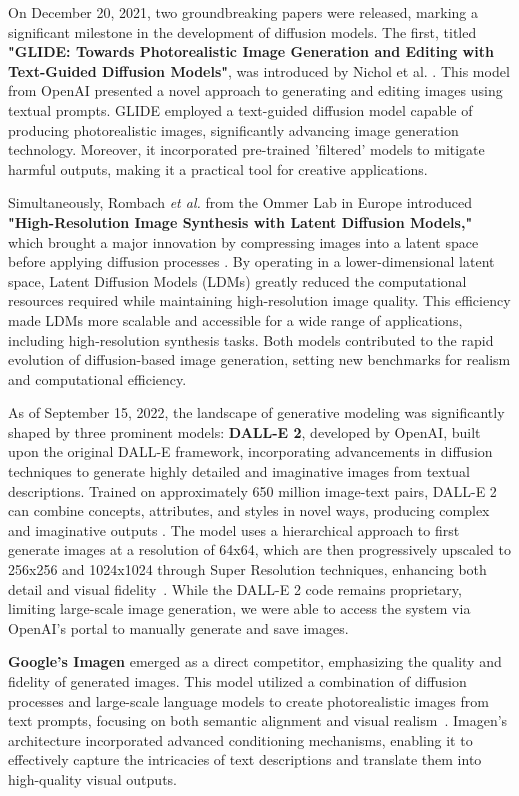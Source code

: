 \documentclass[12pt,DIV14,BCOR12mm,a4paper,footinclude=false,headinclude,parskip=half-,twoside,openright,cleardoublepage=empty,toc=index,bibliography=totoc,listof=totoc]{scrreprt}
\numberwithin{equation}{chapter}
\begin{document}
On December 20, 2021, two groundbreaking papers were released, marking a significant milestone in the development of diffusion models. The first, titled \textbf{"GLIDE: Towards Photorealistic Image Generation and Editing with Text-Guided Diffusion Models"}, was introduced by Nichol et al. \cite{nichol2021glide}. This model from OpenAI presented a novel approach to generating and editing images using textual prompts. GLIDE employed a text-guided diffusion model capable of producing photorealistic images, significantly advancing image generation technology. Moreover, it incorporated pre-trained 'filtered' models to mitigate harmful outputs, making it a practical tool for creative applications.

Simultaneously, Rombach \textit{et al.} from the Ommer Lab in Europe introduced \textbf{"High-Resolution Image Synthesis with Latent Diffusion Models,"} which brought a major innovation by compressing images into a latent space before applying diffusion processes \cite{Latent_Diffusion}. By operating in a lower-dimensional latent space, Latent Diffusion Models (LDMs) greatly reduced the computational resources required while maintaining high-resolution image quality. This efficiency made LDMs more scalable and accessible for a wide range of applications, including high-resolution synthesis tasks. Both models contributed to the rapid evolution of diffusion-based image generation, setting new benchmarks for realism and computational efficiency.

As of September 15, 2022, the landscape of generative modeling was significantly shaped by three prominent models: \textbf{DALL-E 2}, developed by OpenAI, built upon the original DALL-E framework, incorporating advancements in diffusion techniques to generate highly detailed and imaginative images from textual descriptions. Trained on approximately 650 million image-text pairs, DALL-E 2 can combine concepts, attributes, and styles in novel ways, producing complex and imaginative outputs \cite{openai2022_dalle2}. The model uses a hierarchical approach to first generate images at a resolution of 64x64, which are then progressively upscaled to 256x256 and 1024x1024 through Super Resolution techniques, enhancing both detail and visual fidelity~\cite{ramesh2022hierarchical}. While the DALL-E 2 code remains proprietary, limiting large-scale image generation, we were able to access the system via OpenAI’s portal to manually generate and save images.

\textbf{Google's Imagen} emerged as a direct competitor, emphasizing the quality and fidelity of generated images. This model utilized a combination of diffusion processes and large-scale language models to create photorealistic images from text prompts, focusing on both semantic alignment and visual realism~\cite{IMAGEN}. Imagen's architecture incorporated advanced conditioning mechanisms, enabling it to effectively capture the intricacies of text descriptions and translate them into high-quality visual outputs.
\end{document}
